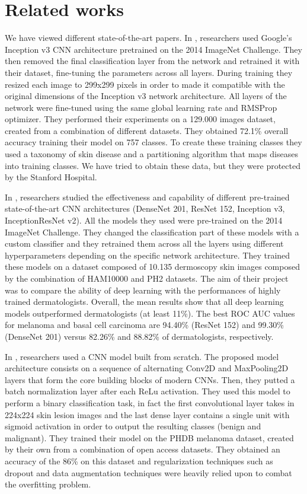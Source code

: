 \section{Related works} \label{related_works}

	We have viewed different state-of-the-art papers. 
	In \cite{article1}, researchers used Google's Inception v3 CNN architecture pretrained on the 2014 ImageNet Challenge. They then removed the final classification layer from the network and retrained it with their dataset, fine-tuning the parameters across all layers. During training they resized each image to 299x299 pixels in order to made it compatible with the original dimensions of the Inception v3 network architecture. All layers of the network were fine-tuned using the same global learning rate and RMSProp optimizer. They performed their experiments on a 129.000 images dataset, created from a combination of different datasets. They obtained 72.1\% overall accuracy training their model on 757 classes. To create these training classes they used a taxonomy of skin disease and a partitioning algorithm that maps diseases into training classes. We have tried to obtain these data, but they were protected by the Stanford Hospital.
	
	\smallskip
	
	In \cite{article3}, researchers studied the effectiveness and capability of different pre-trained state-of-the-art CNN architectures (DenseNet 201, ResNet 152, Inception v3, InceptionResNet v2). All the models they used were pre-trained on the 2014 ImageNet Challenge. They changed the classification part of these models with a custom classifier and they retrained them across all the layers using different hyperparameters depending on the specific network architecture. They trained these models on a dataset composed of 10.135 dermoscopy skin images composed by the combination of HAM10000 and PH2\cite{ph2} datasets.  The aim of their project was to compare the ability of deep learning with the performances of highly trained dermatologists. Overall, the mean results show that all deep learning models outperformed dermatologists (at least 11\%). The best ROC AUC values for melanoma and basal cell carcinoma are 94.40\% (ResNet 152) and 99.30\% (DenseNet 201) versus 82.26\% and 88.82\% of dermatologists, respectively.
	
	\smallskip

	In \cite{article2}, researchers used a CNN model built from scratch. The proposed model architecture consists on a sequence of alternating Conv2D and MaxPooling2D layers that form the core building blocks of modern CNNs. Then, they putted a batch normalization layer after each ReLu activation. They used this model to perform a binary classification task, in fact the first convolutional layer takes in 224x224 skin lesion images and the last dense layer contains a single unit with sigmoid activation in order to output the resulting classes (benign and malignant). They trained their model on the PHDB melanoma dataset, created by their own from a combination of open access datasets. They obtained an accuracy of the 86\% on this dataset and regularization techniques such as dropout and data augmentation techniques were heavily relied upon to combat the overfitting problem.
	

